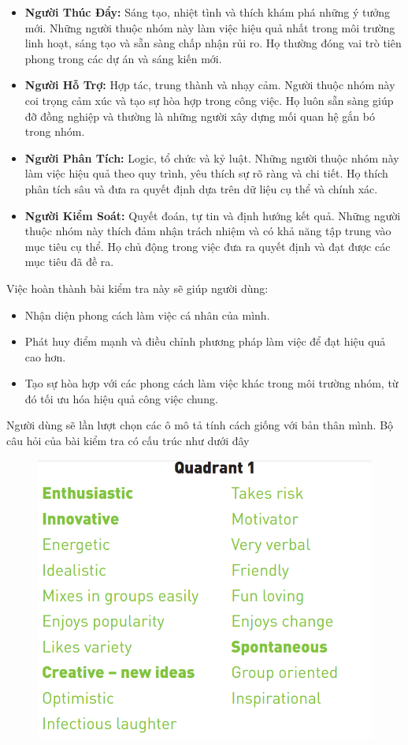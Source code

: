 \begin{itemize}
    \item \textbf{Người Thúc Đẩy:} Sáng tạo, nhiệt tình và thích khám phá những ý tưởng mới. Những người thuộc nhóm này làm việc hiệu quả nhất trong môi trường linh hoạt, sáng tạo và sẵn sàng chấp nhận rủi ro. Họ thường đóng vai trò tiên phong trong các dự án và sáng kiến mới.
    \item \textbf{Người Hỗ Trợ:} Hợp tác, trung thành và nhạy cảm. Người thuộc nhóm này coi trọng cảm xúc và tạo sự hòa hợp trong công việc. Họ luôn sẵn sàng giúp đỡ đồng nghiệp và thường là những người xây dựng mối quan hệ gắn bó trong nhóm.
    \item \textbf{Người Phân Tích:} Logic, tổ chức và kỷ luật. Những người thuộc nhóm này làm việc hiệu quả theo quy trình, yêu thích sự rõ ràng và chi tiết. Họ thích phân tích sâu và đưa ra quyết định dựa trên dữ liệu cụ thể và chính xác.
    \item \textbf{Người Kiểm Soát:} Quyết đoán, tự tin và định hướng kết quả. Những người thuộc nhóm này thích đảm nhận trách nhiệm và có khả năng tập trung vào mục tiêu cụ thể. Họ chủ động trong việc đưa ra quyết định và đạt được các mục tiêu đã đề ra.
\end{itemize}

Việc hoàn thành bài kiểm tra này sẽ giúp người dùng:

\begin{itemize}
    \item Nhận diện phong cách làm việc cá nhân của mình.
    \item Phát huy điểm mạnh và điều chỉnh phương pháp làm việc để đạt hiệu quả cao hơn.
    \item Tạo sự hòa hợp với các phong cách làm việc khác trong môi trường nhóm, từ đó tối ưu hóa hiệu quả công việc chung.
\end{itemize}

Người dùng sẽ lần lượt chọn các ô mô tả tính cách giống với bản thân mình. Bộ câu hỏi của bài kiểm tra có cấu trúc như dưới đây

\begin{figure}[H]
    \centering
    \includegraphics[width=0.9\linewidth, height=0.47\textheight]{images/chap3/ws1.png}
\end{figure}

